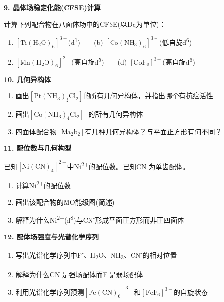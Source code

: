 \textbf{9. 晶体场稳定化能(CFSE)计算}

计算下列配合物在八面体场中的CFSE(以Dq为单位)：

\begin{enumerate}
\def\labelenumi{(\alph{enumi})}
\tightlist
\item
  \(\mathrm{[Ti(H_2O)_6]^{3+}}\)(d\textsuperscript{1})　　(b) \(\mathrm{[Co(NH_3)_6]^{3+}}\)(低自旋d\textsuperscript{6})
\item
  \(\mathrm{[Mn(H_2O)_6]^{2+}}\)(高自旋d\textsuperscript{5})　　(d) \(\mathrm{[CoF_6]^{3-}}\)(高自旋d\textsuperscript{6})
\end{enumerate}

\textbf{10. 几何异构体}

\begin{enumerate}
\def\labelenumi{(\alph{enumi})}
\tightlist
\item
  画出\(\mathrm{[Pt(NH_3)_2Cl_2]}\)的所有几何异构体，并指出哪个有抗癌活性
\item
  画出\(\mathrm{[Co(NH_3)_4Cl_2]^+}\)的所有几何异构体
\item
  四面体配合物\(\mathrm{[Ma_2b_2]}\)有几种几何异构体？与平面正方形有何不同？
\end{enumerate}

\textbf{11. 配位数与几何构型}

已知\(\mathrm{[Ni(CN)_4]^{2-}}\)中Ni\textsuperscript{2+}的配位数。已知CN\textsuperscript{-}为单齿配体。

\begin{enumerate}
\def\labelenumi{(\alph{enumi})}
\tightlist
\item
  计算Ni\textsuperscript{2+}的配位数
\item
  画出该配合物的MO能级图(简述)
\item
  解释为什么Ni\textsuperscript{2+}(d\textsuperscript{8})与CN\textsuperscript{-}形成平面正方形而非正四面体
\end{enumerate}

\textbf{12. 配体场强度与光谱化学序列}

\begin{enumerate}
\def\labelenumi{(\alph{enumi})}
\tightlist
\item
  写出光谱化学序列中F\textsuperscript{-}、H\textsubscript{2}O、NH\textsubscript{3}、CN\textsuperscript{-}的相对位置
\item
  解释为什么CN\textsuperscript{-}是强场配体而F\textsuperscript{-}是弱场配体
\item
  利用光谱化学序列预测\(\mathrm{[Fe(CN)_6]^{3-}}\)和\(\mathrm{[FeF_6]^{3-}}\)的自旋状态
\end{enumerate}

